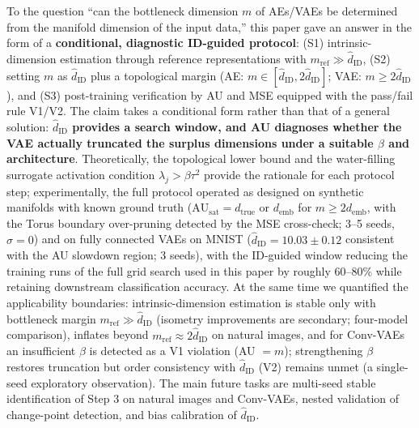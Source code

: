 \documentclass[make,article,submit,pdftex,moreauthors]{Definitions/mdpi}
\newcommand{\hatdID}{\hat{d}_{\mathrm{ID}}}
\newcommand{\dtrue}{d_{\mathrm{true}}}
\newcommand{\AUsat}{\mathrm{AU}_{\mathrm{sat}}}
\newcommand{\demb}{d_{\mathrm{emb}}}
\begin{document}
To the question ``can the bottleneck dimension $m$ of AEs/VAEs be determined
from the manifold dimension of the input data,'' this paper gave an answer
in the form of a \textbf{conditional, diagnostic ID-guided protocol}:
(S1) intrinsic-dimension estimation through reference representations with
$m_{\mathrm{ref}} \gg \hatdID$,
(S2) setting $m$ as $\hatdID$ plus a topological margin
(AE: $m \in [\hatdID, 2\hatdID]$; VAE: $m \geq 2\hatdID$), and
(S3) post-training verification by AU and MSE equipped with the pass/fail
rule V1/V2.
The claim takes a conditional form rather than that of a general solution:
\textbf{$\hatdID$ provides a search window, and AU diagnoses whether the
VAE actually truncated the surplus dimensions under a suitable $\beta$ and
architecture}.
Theoretically, the topological lower bound and the water-filling surrogate
activation condition $\lambda_j > \beta\tau^2$ provide the rationale for
each protocol step;
experimentally, the full protocol operated as designed on synthetic
manifolds with known ground truth ($\AUsat = \dtrue$ or $\demb$ for
$m \geq 2\demb$, with the Torus boundary over-pruning detected by the MSE
cross-check; 3--5 seeds, $\sigma = 0$) and on fully connected VAEs on MNIST
($\hatdID = 10.03 \pm 0.12$ consistent with the AU slowdown region;
3 seeds), with the ID-guided window reducing the training runs of the full
grid search used in this paper by roughly 60--80\% while retaining
downstream classification accuracy.
At the same time we quantified the applicability boundaries:
intrinsic-dimension estimation is stable only with bottleneck margin
$m_{\mathrm{ref}} \gg \hatdID$ (isometry improvements are secondary;
four-model comparison), inflates beyond
$m_{\mathrm{ref}} \approx 2\hatdID$ on natural images, and for Conv-VAEs an
insufficient $\beta$ is detected as a V1 violation (AU $= m$); strengthening
$\beta$ restores truncation but order consistency with $\hatdID$ (V2)
remains unmet (a single-seed exploratory observation).
The main future tasks are multi-seed stable identification of Step 3 on
natural images and Conv-VAEs, nested validation of change-point detection,
and bias calibration of $\hatdID$.


\end{document}
